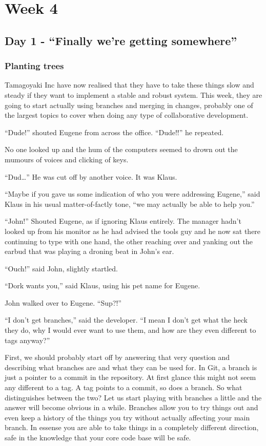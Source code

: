 \cleardoublepage
\chapter{Week 4}
\section{Day 1 - ``Finally we're getting somewhere''}
\subsection{Planting trees}

Tamagoyaki Inc have now realised that they have to take these things slow and steady if they want to implement a stable and robust system.  This week, they are going to start actually using branches and merging in changes, probably one of the largest topics to cover when doing any type of collaborative development.  

\begin{trenches}
``Dude!'' shouted Eugene from across the office.  ``Dude!!'' he repeated.

No one looked up and the hum of the computers seemed to drown out the mumours of voices and clicking of keys.  

``Dud\ldots'' He was cut off by another voice.  It was Klaus.

``Maybe if you gave us some indication of who you were addressing Eugene,'' said Klaus in his usual matter-of-factly tone, ``we may actually be able to help you.''  

``John!''  Shouted Eugene, as if ignoring Klaus entirely.  The manager hadn't looked up from his monitor as he had advised the tools guy and he now sat there continuing to type with one hand, the other reaching over and yanking out the earbud that was playing a droning beat in John's ear.

``Ouch!'' said John, slightly startled.

``Dork wants you,'' said Klaus, using his pet name for Eugene.  

John walked over to Eugene.  ``Sup?!''

``I don't get branches,'' said the developer.  ``I mean I don't get what the heck they do, why I would ever want to use them, and how are they even different to tags anyway?''
\end{trenches}

First, we should probably start off by answering that very question and describing what branches are and what they can be used for.  In Git, a branch is just a pointer to a commit in the repository.  At first glance this might not seem any different to a tag.  A tag points to a commit, so does a branch.  So what distinguishes between the two?  Let us start playing with branches a little and the answer will become obvious in a while.  Branches allow you to try things out and even keep a history of the things you try without actually affecting your main branch.  In essense you are able to take things in a completely different direction, safe in the knowledge that your core code base will be safe.

